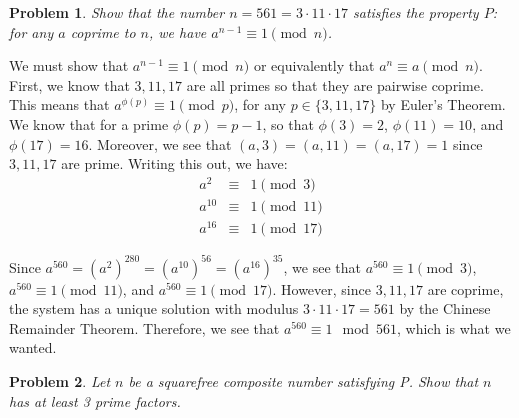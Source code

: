 \documentclass[psamsfonts]{amsart}
\newtheorem{prob}{Problem}[section]
\newenvironment{sol}{{\bfseries Solution}}{\qedsymbol}
\theoremstyle{definition}
\theoremstyle{remark}
\numberwithin{equation}{section}
\begin{document}
\begin{prob}
Show that the number $n=561 = 3 \cdot 11 \cdot 17$ satisfies the property $P$: for any $a$ coprime to $n$, we have $a^{n-1} \equiv 1 \pmod{n}$.
\end{prob}

\begin{sol}
We must show that $a^{n-1} \equiv 1 \pmod{n}$ or equivalently that $a^{n} \equiv a \pmod{n}$. First, we know that $3,11,17$ are all primes so that they are pairwise coprime. This means that $a^{\phi(p)} \equiv 1 \pmod{p}$, for any $p \in \{3,11,17\}$ by Euler's Theorem. We know that for a prime $\phi(p) = p - 1$, so that $\phi(3) = 2$, $ \phi(11) = 10$, and $\phi(17) = 16$. Moreover, we see that $(a, 3) = (a,11) = (a,17) = 1$ since $3,11,17$ are prime. Writing this out, we have:
\begin{eqnarray}
a^2 &\equiv& 1 \pmod{3} \\
a^{10} &\equiv& 1 \pmod{11} \\
a^{16} &\equiv& 1 \pmod{17} 
\end{eqnarray}

Since $a^{560} = (a^2)^{280} = (a^{10})^{56} = (a^{16})^{35}$, we see that $a^{560} \equiv 1 \pmod{3}$, $a^{560} \equiv 1 \pmod{11}$, and $a^{560} \equiv 1 \pmod{17}$. However, since $3,11,17$ are coprime, the system has a unique solution with modulus $3 \cdot 11 \cdot 17 = 561$ by the Chinese Remainder Theorem. Therefore, we see that $a^{560} \equiv 1 \mod{561}$, which is what we wanted.
\end{sol}

\begin{prob}
Let $n$ be a squarefree composite number satisfying P. Show that $n$ has at least 3 prime factors.
\end{prob}
\end{document}
